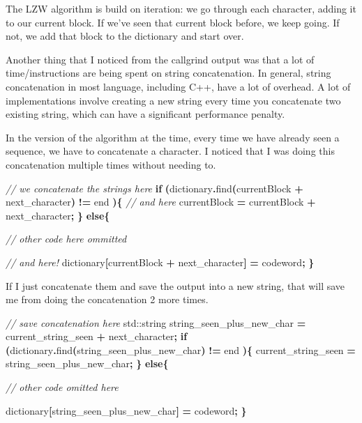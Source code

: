 \documentclass[12pt,twoside]{reedthesis}
\newenvironment{Shaded}{\begin{snugshade}}{\end{snugshade}}
\newcommand{\BuiltInTok}[1]{#1}
\newcommand{\CommentTok}[1]{\textcolor[rgb]{0.56,0.35,0.01}{\textit{#1}}}
\newcommand{\ControlFlowTok}[1]{\textcolor[rgb]{0.13,0.29,0.53}{\textbf{#1}}}
\newcommand{\NormalTok}[1]{#1}
\newcommand{\OperatorTok}[1]{\textcolor[rgb]{0.81,0.36,0.00}{\textbf{#1}}}
\begin{document}
The LZW algorithm is build on iteration: we go through each character, adding it to our current block. If we've seen that current block before, we keep going. If not, we add that block to the dictionary and start over.

Another thing that I noticed from the callgrind output was that a lot of time/instructions are being spent on string concatenation. In general, string concatenation in most language, including C++, have a lot of overhead. A lot of implementations involve creating a new string every time you concatenate two existing string, which can have a significant performance penalty.

In the version of the algorithm at the time, every time we have already seen a sequence, we have to concatenate a character. I noticed that I was doing this concatenation multiple times without needing to.
\begin{Shaded}
\begin{Highlighting}[]
        \CommentTok{// we concatenate the strings here}
        \ControlFlowTok{if} \OperatorTok{(}\NormalTok{dictionary}\OperatorTok{.}\NormalTok{find}\OperatorTok{(}\NormalTok{currentBlock }\OperatorTok{+}\NormalTok{ next\_character}\OperatorTok{)} \OperatorTok{!=}\NormalTok{ end }\OperatorTok{)\{}
            \CommentTok{// and here}
\NormalTok{            currentBlock }\OperatorTok{=}\NormalTok{ currentBlock }\OperatorTok{+}\NormalTok{ next\_character}\OperatorTok{;}
        \OperatorTok{\}}
        \ControlFlowTok{else}\OperatorTok{\{}

            \CommentTok{// other code here ommitted}


            \CommentTok{// and here! }
\NormalTok{            dictionary}\OperatorTok{[}\NormalTok{currentBlock }\OperatorTok{+}\NormalTok{ next\_character}\OperatorTok{]} \OperatorTok{=}\NormalTok{ codeword}\OperatorTok{;}
        \OperatorTok{\}}
\end{Highlighting}
\end{Shaded}
If I just concatenate them and save the output into a new string, that will save me from doing the concatenation 2 more times.
\begin{Shaded}
\begin{Highlighting}[]
    \CommentTok{// save concatenation here}
      \BuiltInTok{std::}\NormalTok{string}\OperatorTok{ }\NormalTok{string\_seen\_plus\_new\_char }\OperatorTok{=}\NormalTok{ current\_string\_seen }\OperatorTok{+}\NormalTok{ next\_character}\OperatorTok{;}
        \ControlFlowTok{if} \OperatorTok{(}\NormalTok{dictionary}\OperatorTok{.}\NormalTok{find}\OperatorTok{(}\NormalTok{string\_seen\_plus\_new\_char}\OperatorTok{)} \OperatorTok{!=}\NormalTok{ end }\OperatorTok{)\{}
\NormalTok{            current\_string\_seen }\OperatorTok{=}\NormalTok{ string\_seen\_plus\_new\_char}\OperatorTok{;}
        \OperatorTok{\}}
        \ControlFlowTok{else}\OperatorTok{\{}

    \CommentTok{// other code omitted here}

\NormalTok{            dictionary}\OperatorTok{[}\NormalTok{string\_seen\_plus\_new\_char}\OperatorTok{]} \OperatorTok{=}\NormalTok{ codeword}\OperatorTok{;}
        \OperatorTok{\}}
\end{Highlighting}
\end{Shaded}
\end{document}
